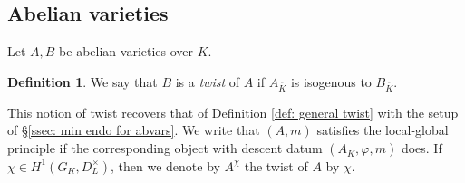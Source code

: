 \documentclass[a4paper,10pt]{amsart}
\theoremstyle{plain}
\theoremstyle{definition}
\newtheorem{definition}[theorem]{Definition}
\theoremstyle{remark}
\begin{document}
\subsection{Abelian varieties}\label{sec: twist of an abvar}
Let \(A, B\) be abelian varieties over \(K\).
\begin{definition}
We say that \(B\) is a \emph{twist} of \(A\) if \(A_{\overline{K}}\) is isogenous to \(B_{\overline{K}}\).
\end{definition}
This notion of twist recovers that of Definition \ref{def: general twist} with the setup of \S\ref{ssec: min endo for abvars}. We write that \((A, m)\) satisfies the local-global principle if the corresponding object with descent datum \((A_{\overline{K}}, \varphi, m)\) does.
If \(\chi\in H^1(G_K, D_L^\times)\), then we denote by \(A^\chi\) the twist of \(A\) by \(\chi\).
\end{document}
